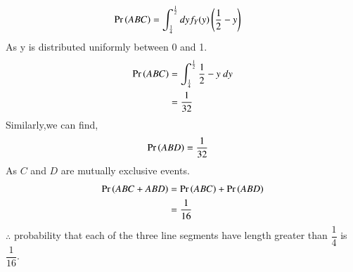 \documentclass[journal,12pt,twocolumn]{IEEEtran}
\begin{document}
     \begin{align}
    \Pr\left(ABC\right)&=\int_{\frac{1}{4}}^{\frac{1}{2}}dyf_Y(y)\left(\frac{1}{2}-y\right)
    \end{align}
    As y is distributed uniformly between 0 and 1.
    \begin{align}
   \Pr\left(ABC\right) &=\int_{\frac{1}{4}}^{\frac{1}{2}}\frac{1}{2}-y~dy\\
    &=\dfrac{1}{32}
\end{align}
Similarly,we can find,
\begin{align}
    \Pr\left(ABD\right)&=\dfrac{1}{32}
\end{align}
As $C$ and $D$ are mutually exclusive events.
\begin{align}
    \Pr\left(ABC+ABD\right)&=\Pr\left(ABC\right)+\Pr\left(ABD\right)\\
    &=\dfrac{1}{16} 
\end{align}
$\therefore$ probability that each of the three line segments have length greater than $\dfrac{1}{4}$  is  $\dfrac{1}{16}$.
\end{document}
